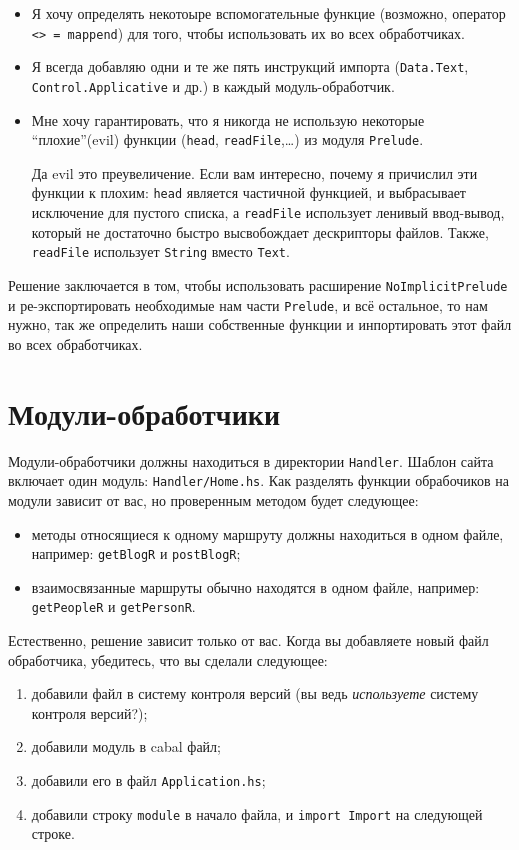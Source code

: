 \begin{itemize}
  \item Я хочу определять некотоыре вспомогательные функцие (возможно, оператор \lstinline!<> = mappend!) 
для того, чтобы использовать их во всех обработчиках.
  \item Я всегда добавляю одни и те же пять инструкций импорта  (\lstinline!Data.Text!, \lstinline!Control.Applicative! и др.) в каждый модуль-обработчик.
  \item Мне хочу гарантировать, что я никогда не использую некоторые ``плохие''(evil) функции (\lstinline!head!,
\lstinline!readFile!,\ldots) из модуля \lstinline!Prelude!.
    \begin{remark}
      Да evil это преувеличение. Если вам интересно, почему я причислил эти функции к плохим:
      \lstinline!head! является частичной функцией, и выбрасывает исключение для пустого списка,
      а \lstinline!readFile! использует ленивый ввод-вывод, который не достаточно быстро
      высвобождает дескрипторы файлов. Также, \lstinline!readFile! использует \lstinline!String! вместо
      \lstinline!Text!.
    \end{remark}
\end{itemize}

Решение заключается в том, чтобы использовать расширение \texttt{NoImplicitPrelude} и
ре-экспортировать необходимые нам части \lstinline!Prelude!, и всё остальное, то нам нужно, так же
определить наши собственные функции и инпортировать этот файл во всех обработчиках.

\section{Модули-обработчики}

Модули-обработчики должны находиться в директории \lstinline!Handler!. Шаблон сайта включает один
модуль: \lstinline!Handler/Home.hs!. Как разделять функции обрабочиков на модули зависит от вас, но
проверенным методом будет следующее:
\begin{itemize}
    \item методы относящиеся к одному маршруту должны находиться в одном файле, например: \lstinline!getBlogR!
          и \lstinline!postBlogR!;
    \item взаимосвязанные маршруты обычно находятся в одном файле, например: \lstinline!getPeopleR! и \lstinline!getPersonR!.
\end{itemize}

Естественно, решение зависит только от вас. Когда вы добавляете новый файл обработчика, убедитесь,
что вы сделали следующее:
\begin{enumerate}
  \item добавили файл в систему контроля версий (вы ведь \emph{используете} систему контроля версий?);
  \item добавили модуль в cabal файл;
  \item добавили его в файл \texttt{Application.hs};
  \item добавили строку \lstinline!module! в начало файла, и \lstinline!import Import! на следующей строке.
\end{enumerate}

